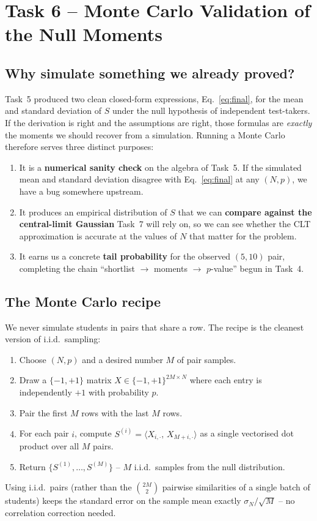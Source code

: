 \documentclass[11pt,a4paper]{article}
\begin{document}
\section{Task 6 -- Monte Carlo Validation of the Null Moments}

\subsection{Why simulate something we already proved?}
Task~5 produced two clean closed-form expressions, Eq.~\eqref{eq:final},
for the mean and standard deviation of $S$ under the null hypothesis of
independent test-takers. If the derivation is right and the assumptions
are right, those formulas are \emph{exactly} the moments we should
recover from a simulation. Running a Monte Carlo therefore serves three
distinct purposes:
\begin{enumerate}[leftmargin=2em,nosep]
  \item It is a \textbf{numerical sanity check} on the algebra of
        Task~5. If the simulated mean and standard deviation disagree
        with Eq.~\eqref{eq:final} at any $(N, p)$, we have a bug
        somewhere upstream.
  \item It produces an empirical distribution of $S$ that we can
        \textbf{compare against the central-limit Gaussian} Task~7 will
        rely on, so we can see whether the CLT approximation is
        accurate at the values of $N$ that matter for the problem.
  \item It earns us a concrete \textbf{tail probability} for the
        observed $(5,10)$ pair, completing the chain
        ``shortlist $\to$ moments $\to$ $p$-value'' begun in Task~4.
\end{enumerate}

\subsection{The Monte Carlo recipe}
We never simulate students in pairs that share a row. The recipe is
the cleanest version of i.i.d.\ sampling:
\begin{enumerate}[leftmargin=2em,nosep]
  \item Choose $(N, p)$ and a desired number $M$ of pair samples.
  \item Draw a $\{-1,+1\}$ matrix $X \in \{-1,+1\}^{2M \times N}$
        where each entry is independently $+1$ with probability $p$.
  \item Pair the first $M$ rows with the last $M$ rows.
  \item For each pair $i$, compute
        $S^{(i)} = \langle X_{i,\cdot},\, X_{M+i,\cdot}\rangle$ as a
        single vectorised dot product over all $M$ pairs.
  \item Return $\{S^{(1)}, \ldots, S^{(M)}\}$ -- $M$ i.i.d.\ samples
        from the null distribution.
\end{enumerate}
Using i.i.d.\ pairs (rather than the $\binom{2M}{2}$ pairwise
similarities of a single batch of students) keeps the standard error on
the sample mean exactly $\sigma_N / \sqrt{M}$ -- no correlation
correction needed.
\end{document}
